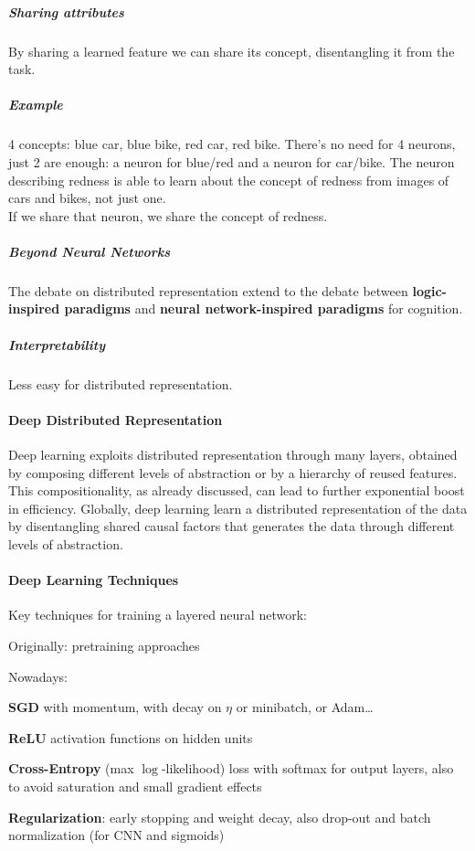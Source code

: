\documentclass[10pt]{report}
\begin{document}
\subparagraph{Sharing attributes} By sharing a learned feature we can share its concept, disentangling it from the task.
\subparagraph{Example} 4 concepts: blue car, blue bike, red car, red bike. There's no need for 4 neurons, just 2 are enough: a neuron for blue/red and a neuron for car/bike. The neuron describing redness is able to learn about the concept of redness from images of cars and bikes, not just one.\\
If we share that neuron, we share the concept of redness.
\subparagraph{Beyond Neural Networks} The debate on distributed representation extend to the debate between \textbf{logic-inspired paradigms} and \textbf{neural network-inspired paradigms} for cognition.
\subparagraph{Interpretability} Less easy for distributed representation.
\paragraph{Deep Distributed Representation} Deep learning exploits distributed representation through many layers, obtained by composing different levels of abstraction or by a hierarchy of reused features. This compositionality, as already discussed, can lead to further exponential boost in efficiency. Globally, deep learning learn a distributed representation of the data by disentangling shared causal factors that generates the data through different levels of abstraction.
\pagebreak
\paragraph{Deep Learning Techniques} Key techniques for training a layered neural network:
\begin{list}{}{}
	\item Originally: pretraining approaches
	\item Nowadays:
	\begin{list}{}{}
		\item \textbf{SGD} with momentum, with decay on $\eta$ or minibatch, or Adam\ldots
		\item \textbf{ReLU} activation functions on hidden units
		\item \textbf{Cross-Entropy} (max $\log$-likelihood) loss with softmax for output layers, also to avoid saturation and small gradient effects
		\item \textbf{Regularization}: early stopping and weight decay, also drop-out and batch normalization (for CNN and sigmoids)
	\end{list}
\end{list} 
\end{document}

